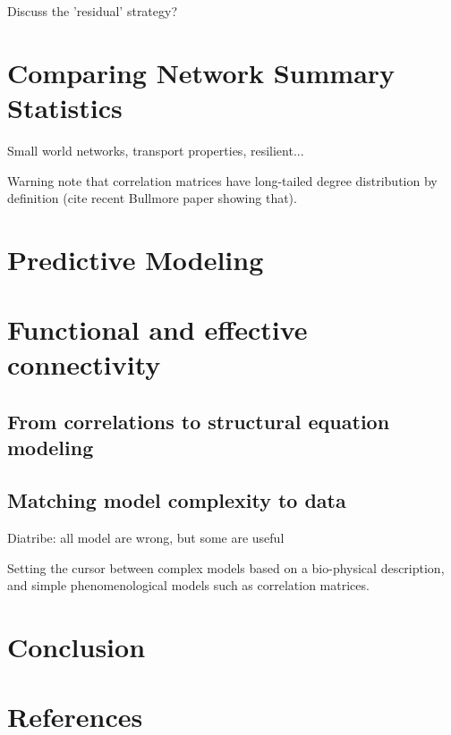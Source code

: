 \documentclass[5p]{elsarticle}
\begin{document}
Discuss the 'residual' strategy?
\cite{varoquaux2010b}


\section{Comparing Network Summary Statistics}

Small world networks, transport properties, resilient...

Warning note that correlation matrices have long-tailed degree
distribution by definition (cite recent Bullmore paper showing that).


\section{Predictive Modeling}


\section{Functional and effective connectivity}

\subsection{From correlations to structural equation modeling}

\cite{mcintosh1994}
\cite{marrelec2007}
\cite{marrelec2009}

\subsection{Matching model complexity to data}

Diatribe: all model are wrong, but some are useful

Setting the cursor between complex models based on a bio-physical
description, and simple phenomenological models such as correlation
matrices.

\cite{mcintosh2010}


\section{Conclusion}

{
\section*{References} \small 
 }

\end{document}
